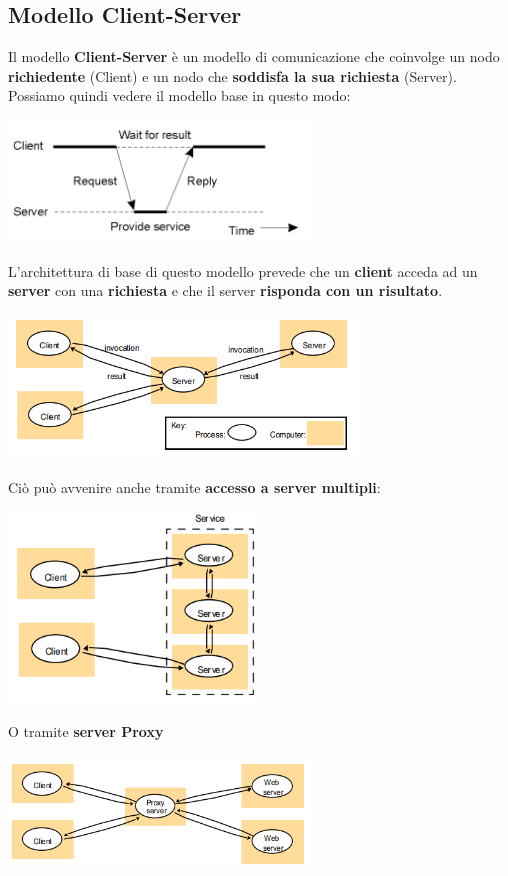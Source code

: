 \documentclass[12pt]{article}
\begin{document}
\subsection{Modello Client-Server}
Il modello \textbf{Client-Server} è un modello di comunicazione che coinvolge un nodo \textbf{richiedente} (Client) e un nodo che \textbf{soddisfa la sua richiesta} (Server). Possiamo quindi vedere il modello base in questo modo:
\begin{center}
    \includegraphics[width = 0.60\textwidth]{Images/16.PNG}
\end{center}
L'architettura di base di questo modello prevede che un \textbf{client} acceda ad un \textbf{server} con una \textbf{richiesta} e che il server \textbf{risponda con un risultato}.
\begin{center}
    \includegraphics[width = 0.70\textwidth]{Images/17.PNG}
\end{center}
Ciò può avvenire anche tramite \textbf{accesso a server multipli}:
\begin{center}
    \includegraphics[width = 0.50\textwidth]{Images/18.PNG}
\end{center}
O tramite \textbf{server Proxy}
\begin{center}
    \includegraphics[width = 0.60\textwidth]{Images/19.PNG}
\end{center}
\end{document}
